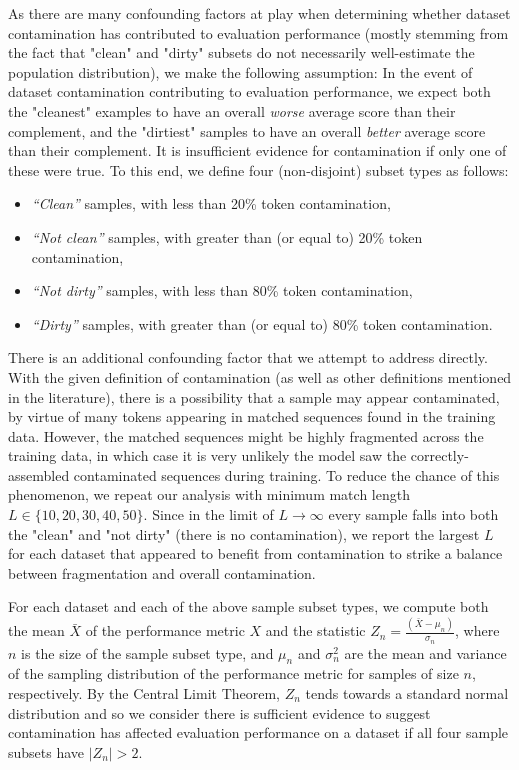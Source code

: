 \documentclass{article}
\begin{document}
As there are many confounding factors at play when determining whether dataset contamination has contributed to evaluation performance (mostly stemming from the fact that "clean" and "dirty" subsets do not necessarily well-estimate the population distribution), we make the following assumption: In the event of dataset contamination contributing to evaluation performance, we expect both the "cleanest" examples to have an overall \emph{worse} average score than their complement, and the "dirtiest" samples to have an overall \emph{better} average score than their complement. It is insufficient evidence for contamination if only one of these were true.  To this end, we define four (non-disjoint) subset types as follows:
\begin{itemize}
    \item \textit{``Clean''} samples, with less than 20\% token contamination,
    \item \textit{``Not clean''} samples, with greater than (or equal to) 20\% token contamination,
    \item \textit{``Not dirty''} samples, with less than 80\% token contamination,
    \item \textit{``Dirty''} samples, with greater than (or equal to) 80\% token contamination.
\end{itemize}

There is an additional confounding factor that we attempt to address directly. With the given definition of contamination (as well as other definitions mentioned in the literature), there is a possibility that a sample may appear contaminated, by virtue of many tokens appearing in matched sequences found in the training data. However, the matched sequences might be highly fragmented across the training data, in which case it is very unlikely the model saw the correctly-assembled contaminated sequences during training.  To reduce the chance of this phenomenon, we repeat our analysis with minimum match length $L\in \{10, 20, 30, 40, 50\}$.  Since in the limit of $L\rightarrow \infty$ every sample falls into both the "clean" and "not dirty" (there is no contamination), we report the largest $L$ for each dataset that appeared to benefit from contamination to strike a balance between fragmentation and overall contamination.

For each dataset and each of the above sample subset types, we compute both the mean $\bar{X}$ of the performance metric $X$ and the statistic 
$Z_n = \frac{(\bar{X}-\mu_n)}{\sigma_n}$, where $n$ is the size of the sample subset type, and $\mu_n$ and $\sigma_n^2$ are the mean and variance of the sampling distribution of the performance metric for samples of size $n$, respectively. By the Central Limit Theorem, $Z_n$ tends towards a standard normal distribution and so we consider there is sufficient evidence to suggest contamination has affected evaluation performance on a dataset if all four sample subsets have $|Z_n|>2$.
\end{document}
